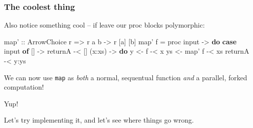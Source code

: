 \documentclass[]{article}
\newenvironment{Shaded}{}{}
\newcommand{\KeywordTok}[1]{\textcolor[rgb]{0.00,0.44,0.13}{\textbf{#1}}}
\newcommand{\DataTypeTok}[1]{\textcolor[rgb]{0.56,0.13,0.00}{#1}}
\newcommand{\DecValTok}[1]{\textcolor[rgb]{0.25,0.63,0.44}{#1}}
\newcommand{\OtherTok}[1]{\textcolor[rgb]{0.00,0.44,0.13}{#1}}
\newcommand{\FunctionTok}[1]{\textcolor[rgb]{0.02,0.16,0.49}{#1}}
\newcommand{\NormalTok}[1]{#1}
\begin{document}
\subsubsection{The coolest thing}\label{the-coolest-thing}

Also notice something cool -- if leave our proc blocks polymorphic:

\begin{Shaded}
\begin{Highlighting}[]
\OtherTok{map' ::} \DataTypeTok{ArrowChoice}\NormalTok{ r }\OtherTok{=>}\NormalTok{ r a b }\OtherTok{->}\NormalTok{ r [a] [b]}
\NormalTok{map' f }\FunctionTok{=}\NormalTok{ proc input }\OtherTok{->} \KeywordTok{do}
    \KeywordTok{case}\NormalTok{ input }\KeywordTok{of}
\NormalTok{      []     }\OtherTok{->}
\NormalTok{          returnA        }\FunctionTok{-<}\NormalTok{ []}
\NormalTok{      (x}\FunctionTok{:}\NormalTok{xs) }\OtherTok{->} \KeywordTok{do}
\NormalTok{          y  }\OtherTok{<-}\NormalTok{ f        }\FunctionTok{-<}\NormalTok{ x}
\NormalTok{          ys }\OtherTok{<-}\NormalTok{ map' f   }\FunctionTok{-<}\NormalTok{ xs}
\NormalTok{          returnA        }\FunctionTok{-<}\NormalTok{ y}\FunctionTok{:}\NormalTok{ys}
\end{Highlighting}
\end{Shaded}

We can now use \texttt{map\textquotesingle{}} as \emph{both} a normal,
sequentual function \emph{and} a parallel, forked computation!

\begin{Shaded}
\end{Shaded}

Yup!

Let's try implementing it, and let's see where things go wrong.
\end{document}
